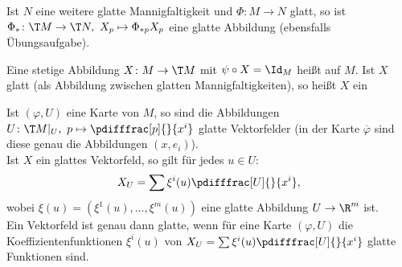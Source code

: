 Ist $N$ eine weitere glatte Mannigfaltigkeit und $\Phi \colon M \to N$ glatt, so ist $\Phi_{*} \colon \T M \to \T N, \ X_p \mapsto \Phi_{*p}X_p$ eine glatte Abbildung (ebensfalls Übungsaufgabe).\\


\begin{dfn}
  Eine stetige Abbildung $X \colon M \to \T M$ mit $\psi \circ X = \Id_M$ heißt  auf $M$.
Ist $X$ glatt (als Abbildung zwischen glatten Mannigfaltigkeiten), so heißt $X$ ein 
\end{dfn}

\begin{bem}
  Ist $(\varphi, U)$ eine Karte von $M$, so sind die Abbildungen $U \colon \T M|_U, \ p \mapsto \pdifffrac[p]{}{x^{i}}$ glatte Vektorfelder (in der Karte $\overline \varphi$ sind diese genau die Abbildungen $(x,e_i)$).\\
Ist $X$ ein glattes Vektorfeld, so gilt für jedes $u \in U$:
\begin{align*}
  X_U = \sum \xi^i(u) \pdifffrac[U]{}{x^i},
\end{align*}
wobei $\xi(u) = (\xi^1(u), \ldots, \xi^m(u))$ eine glatte Abbildung $U \to \R^m$ ist.\\

Ein Vektorfeld ist genau dann glatte, wenn für eine Karte $(\varphi, U)$ die Koeffizientenfunktionen $\xi^i(u)$ von $X_U = \sum \xi^i(u) \pdifffrac[U]{}{x^i}$ glatte Funktionen sind.
\end{bem}

